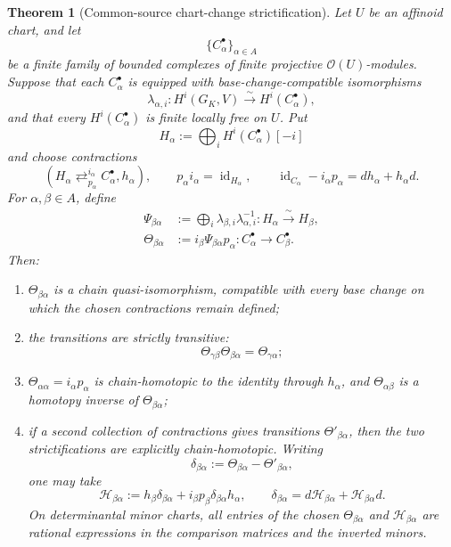 \documentclass[11pt]{article}
\newtheorem{theorem}{Theorem}[section]
\theoremstyle{definition}
\begin{document}
\begin{theorem}[Common-source chart-change strictification]\label{thm:common-source-chart-change}
Let $U$ be an affinoid chart, and let
\[
 \{C_\alpha^\bullet\}_{\alpha\in A}
\]
be a finite family of bounded complexes of finite projective $\mathcal O(U)$-modules.  Suppose that each $C_\alpha^\bullet$ is equipped with base-change-compatible isomorphisms
\[
 \lambda_{\alpha,i}:H^i(G_K,V)\xrightarrow{\ \sim\ }H^i(C_\alpha^\bullet),
\]
and that every $H^i(C_\alpha^\bullet)$ is finite locally free on $U$.  Put
\[
 H_\alpha:=\bigoplus_iH^i(C_\alpha^\bullet)[-i]
\]
and choose contractions
\begin{equation}\label{eq:tower-chart-contractions}
 \left(H_\alpha
 \mathop{\rightleftarrows}^{i_\alpha}_{p_\alpha}
 C_\alpha^\bullet,h_\alpha\right),
 \qquad
 p_\alpha i_\alpha=\operatorname{id}_{H_\alpha},
 \qquad
 \operatorname{id}_{C_\alpha}-i_\alpha p_\alpha
 =d h_\alpha+h_\alpha d.
\end{equation}
For $\alpha,\beta\in A$, define
\begin{align}
 \Psi_{\beta\alpha}
 &:=\bigoplus_i\lambda_{\beta,i}\lambda_{\alpha,i}^{-1}:
 H_\alpha\xrightarrow{\ \sim\ }H_\beta,\label{eq:tower-cohomology-transition}\\
 \Theta_{\beta\alpha}
 &:=i_\beta\Psi_{\beta\alpha}p_\alpha:
 C_\alpha^\bullet\longrightarrow C_\beta^\bullet.
 \label{eq:tower-chain-transition}
\end{align}
Then:
\begin{enumerate}[label=\textnormal{(\roman*)}]
\item $\Theta_{\beta\alpha}$ is a chain quasi-isomorphism, compatible with every base change on which the chosen contractions remain defined;
\item the transitions are strictly transitive:
\begin{equation}\label{eq:tower-strict-transitivity}
 \Theta_{\gamma\beta}\Theta_{\beta\alpha}
 =\Theta_{\gamma\alpha};
\end{equation}
\item $\Theta_{\alpha\alpha}=i_\alpha p_\alpha$ is chain-homotopic to the identity through $h_\alpha$, and $\Theta_{\alpha\beta}$ is a homotopy inverse of $\Theta_{\beta\alpha}$;
\item if a second collection of contractions gives transitions $\Theta'_{\beta\alpha}$, then the two strictifications are explicitly chain-homotopic.  Writing
\[
 \delta_{\beta\alpha}:=
 \Theta_{\beta\alpha}-\Theta'_{\beta\alpha},
\]
one may take
\begin{equation}\label{eq:chart-change-explicit-homotopy}
 \mathcal H_{\beta\alpha}
 :=h_\beta\delta_{\beta\alpha}
   +i_\beta p_\beta\delta_{\beta\alpha}h_\alpha,
 \qquad
 \delta_{\beta\alpha}
 =d\mathcal H_{\beta\alpha}
  +\mathcal H_{\beta\alpha}d.
\end{equation}
On determinantal minor charts, all entries of the chosen $\Theta_{\beta\alpha}$ and $\mathcal H_{\beta\alpha}$ are rational expressions in the comparison matrices and the inverted minors.
\end{enumerate}
\end{theorem}
\end{document}
